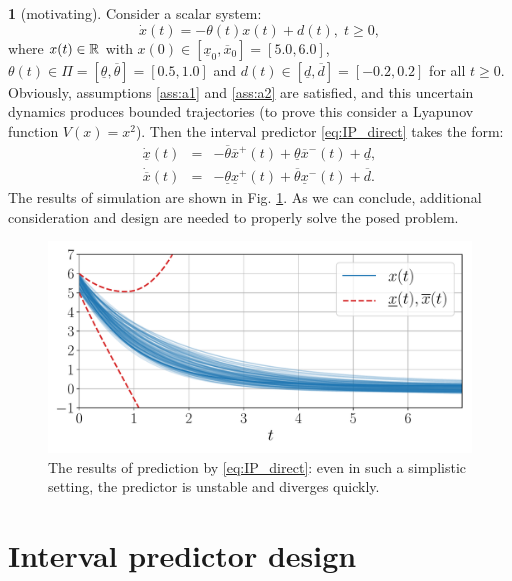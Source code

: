 \documentclass[letterpaper, 10 pt, conference]{ieeeconf}
\theoremstyle{plain}
\theoremstyle{definition}
\newtheorem*{example*}{\protect\examplename}
\theoremstyle{plain}
\theoremstyle{plain}
\theoremstyle{remark}
\providecommand{\examplename}{Example}
\begin{document}
\begin{example*}
[motivating] Consider a scalar system:
\[
\dot{x}(t)=-\theta(t)x(t)+d(t),\;t\geq0,
\]
where $x(t)\in\mathbb{R}$ with $x(0)\in[\underline{x}_{0},\overline{x}_{0}]=[5.0, 6.0]$, $\theta(t)\in\Pi=[\underline{\theta},\overline{\theta}]=[0.5,1.0]$ and $d(t)\in[\underline{d},\overline{d}]=[-0.2,0.2]$ for all $t\geq0$. Obviously, assumptions \ref{ass:a1} and \ref{ass:a2} are satisfied, and this uncertain dynamics produces bounded trajectories (to prove this consider a Lyapunov function $V(x)=x^{2}$). Then the interval predictor \eqref{eq:IP_direct} takes the form:
\begin{eqnarray*}
\dot{\underline{x}}(t) & = & -\overline{\theta}\overline{x}^{+}(t)+\underline{\theta}\overline{x}^{-}(t)+\underline{d},\\
\dot{\overline{x}}(t) & = & -\underline{\theta}\underline{x}^{+}(t)+\overline{\theta}\underline{x}^{-}(t)+\overline{d}.
\end{eqnarray*}
The results of simulation are shown in Fig. \ref{fig:IP_Direct}. As we can conclude, additional consideration and design are needed to properly solve the posed problem.
\begin{figure}
\begin{centering}
\includegraphics[width=\linewidth]{observer-2}
\par\end{centering}
\caption{\label{fig:IP_Direct} The results of prediction by \eqref{eq:IP_direct}: even in such a simplistic setting, the predictor is unstable and diverges quickly.}
\end{figure}
\end{example*}

\section{\label{sec:Main-results} Interval predictor design}
\end{document}
